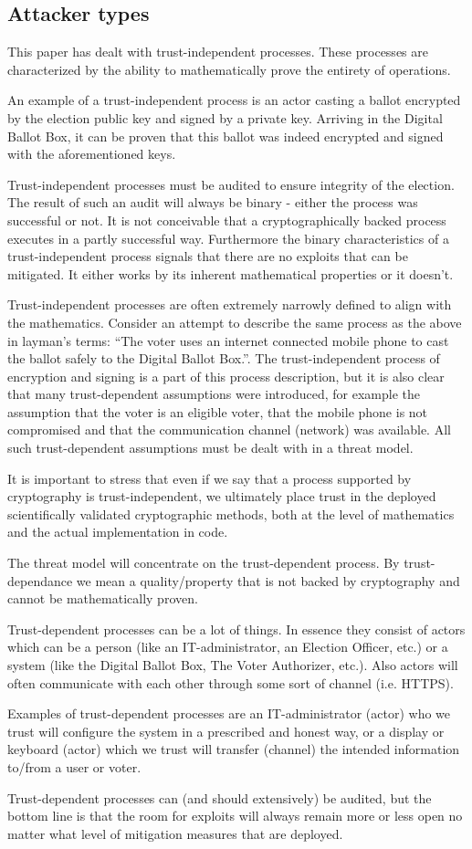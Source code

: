 \subsection{Attacker types} \label{sec: attacker types}
This paper has dealt with trust-independent processes. These processes are characterized by the ability to mathematically prove the entirety of operations.

An example of a trust-independent process is an actor casting a ballot encrypted by the election public key and signed by a private key. Arriving in the Digital Ballot Box, it can be proven that this ballot was indeed encrypted and signed with the aforementioned keys.

Trust-independent processes must be audited to ensure integrity of the election. The result of such an audit will always be binary - either the process was successful or not. It is not conceivable that a cryptographically backed process executes in a partly successful way. Furthermore the binary characteristics of a trust-independent process signals that there are no exploits that can be mitigated. It either works by its inherent mathematical properties or it doesn’t.

Trust-independent processes are often extremely narrowly defined to align with the mathematics. Consider an attempt to describe the same process as the above in layman’s terms: “The voter uses an internet connected mobile phone to cast the ballot safely to the Digital Ballot Box.”. The trust-independent process of encryption and signing is a part of this process description, but it is also clear that many trust-dependent assumptions were introduced, for example the assumption that the voter is an eligible voter, that the mobile phone is not compromised and that the communication channel (network) was available. All such trust-dependent assumptions must be dealt with in a threat model.

It is important to stress that even if we say that a process supported by cryptography is trust-independent, we ultimately place trust in the deployed scientifically validated cryptographic methods, both at the level of mathematics and the actual implementation in code.

The threat model will concentrate on the trust-dependent process. By trust-dependance we mean a quality/property that is not backed by cryptography and cannot be mathematically proven.

Trust-dependent processes can be a lot of things. In essence they consist of actors which can be a person (like an IT-administrator, an Election Officer, etc.) or a system (like the Digital Ballot Box, The Voter Authorizer, etc.). Also actors will often communicate with each other through some sort of channel (i.e. HTTPS).

Examples of trust-dependent processes are an IT-administrator (actor) who we trust will configure the system in a prescribed and honest way, or a display or keyboard (actor) which we trust will transfer (channel) the intended information to/from a user or voter.

Trust-dependent processes can (and should extensively) be audited, but the bottom line is that the room for exploits will always remain more or less open no matter what level of mitigation measures that are deployed.
